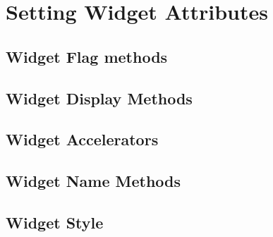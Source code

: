 \chapter{Setting Widget Attributes}
\section{Widget Flag methods}
\section{Widget Display Methods}
\section{Widget Accelerators}
\section{Widget Name Methods}
\section{Widget Style}
